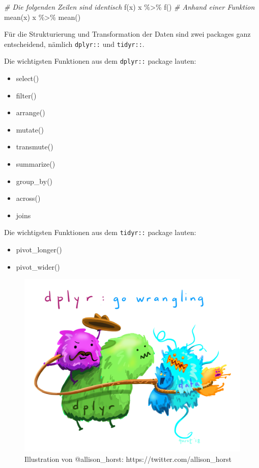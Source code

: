 \documentclass[
]{article}
\newenvironment{Shaded}{\begin{snugshade}}{\end{snugshade}}
\newcommand{\CommentTok}[1]{\textcolor[rgb]{0.56,0.35,0.01}{\textit{#1}}}
\newcommand{\FunctionTok}[1]{\textcolor[rgb]{0.00,0.00,0.00}{#1}}
\newcommand{\NormalTok}[1]{#1}
\newcommand{\SpecialCharTok}[1]{\textcolor[rgb]{0.00,0.00,0.00}{#1}}
\providecommand{\tightlist}{%
  \setlength{\itemsep}{0pt}\setlength{\parskip}{0pt}}
\begin{document}
\begin{Shaded}
\begin{Highlighting}[]
\CommentTok{\# Die folgenden Zeilen sind identisch}
\FunctionTok{f}\NormalTok{(x)}
\NormalTok{x }\SpecialCharTok{\%\textgreater{}\%} \FunctionTok{f}\NormalTok{()}
\CommentTok{\# Anhand einer Funktion}
\FunctionTok{mean}\NormalTok{(x)}
\NormalTok{x }\SpecialCharTok{\%\textgreater{}\%} \FunctionTok{mean}\NormalTok{()}
\end{Highlighting}
\end{Shaded}

Für die Strukturierung und Transformation der Daten sind zwei packages ganz entscheidend, nämlich \texttt{dplyr::} und \texttt{tidyr::}.

Die wichtigsten Funktionen aus dem \texttt{dplyr::} package lauten:

\begin{itemize}
\tightlist
\item
  select()
\item
  filter()
\item
  arrange()
\item
  mutate()
\item
  transmute()
\item
  summarize()
\item
  group\_by()
\item
  across()
\item
  joins
\end{itemize}

Die wichtigsten Funktionen aus dem \texttt{tidyr::} package lauten:

\begin{itemize}
\tightlist
\item
  pivot\_longer()
\item
  pivot\_wider()
\end{itemize}

\begin{figure}

{\centering \includegraphics[width=1\linewidth]{images/032} 

}

\caption{Illustration von @allison_horst: https://twitter.com/allison_horst}\label{fig:unnamed-chunk-124}
\end{figure}
\end{document}
